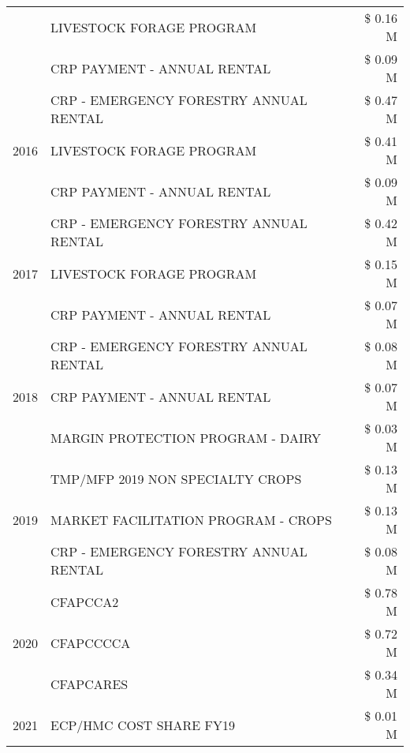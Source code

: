 \begin{tabular}{llr}
 & LIVESTOCK FORAGE PROGRAM & \$ 0.16 M \\
 & CRP PAYMENT - ANNUAL RENTAL & \$ 0.09 M \\
\cline{1-3}
\multirow[t]{3}{*}{2016} & CRP - EMERGENCY FORESTRY ANNUAL RENTAL & \$ 0.47 M \\
 & LIVESTOCK FORAGE PROGRAM & \$ 0.41 M \\
 & CRP PAYMENT - ANNUAL RENTAL & \$ 0.09 M \\
\cline{1-3}
\multirow[t]{3}{*}{2017} & CRP - EMERGENCY FORESTRY ANNUAL RENTAL & \$ 0.42 M \\
 & LIVESTOCK FORAGE PROGRAM & \$ 0.15 M \\
 & CRP PAYMENT - ANNUAL RENTAL & \$ 0.07 M \\
\cline{1-3}
\multirow[t]{3}{*}{2018} & CRP - EMERGENCY FORESTRY ANNUAL RENTAL & \$ 0.08 M \\
 & CRP PAYMENT - ANNUAL RENTAL & \$ 0.07 M \\
 & MARGIN PROTECTION PROGRAM - DAIRY & \$ 0.03 M \\
\cline{1-3}
\multirow[t]{3}{*}{2019} & TMP/MFP 2019 NON SPECIALTY CROPS & \$ 0.13 M \\
 & MARKET FACILITATION PROGRAM - CROPS & \$ 0.13 M \\
 & CRP - EMERGENCY FORESTRY ANNUAL RENTAL & \$ 0.08 M \\
\cline{1-3}
\multirow[t]{3}{*}{2020} & CFAPCCA2 & \$ 0.78 M \\
 & CFAPCCCCA & \$ 0.72 M \\
 & CFAPCARES & \$ 0.34 M \\
\cline{1-3}
2021 & ECP/HMC COST SHARE FY19 & \$ 0.01 M \\
\cline{1-3}
\bottomrule
\end{tabular}
